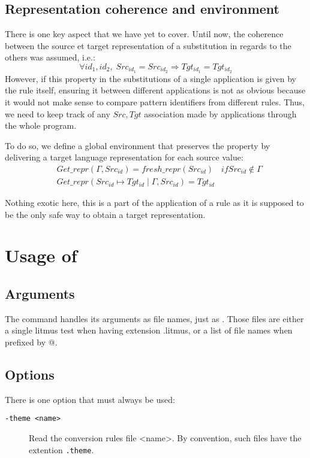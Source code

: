 \subsection{Representation coherence and environment}
There is one key aspect that we have yet to cover. Until now, the coherence between the source et target representation of
a substitution in regards to the others was assumed, i.e.:
\begin{equation*}
\forall id_1,id_2, \; Src_{id_1} = Src_{id_2} \Rightarrow Tgt_{id_1} = Tgt_{id_2}
\end{equation*}
However, if this property in the substitutions of a single application is given by the rule itself,
ensuring it between different applications is not as obvious because it would not make sense to
compare pattern identifiers from different rules. Thus, we need to keep track of any $Src,Tgt$
association made by applications through the whole program.

To do so, we define a global environment that preserves the property by delivering a target
language representation for each source value:
\begin{align*}
& Get\_repr(\Gamma,Src_{id}) = fresh\_repr(Src_{id}) & if Src_{id} \notin \Gamma\\
& Get\_repr(Src_{id}\mapsto Tgt_{id}\mid\Gamma,Src_{id}) = Tgt_{id} &
\end{align*}

Nothing exotic here, this is a part of the application of a rule as it is supposed
to be the only safe way to obtain a target representation.

\section{Usage of \jingle{}}

\subsection{Arguments}
The command \jingle{} handles its arguments as file names, just as \herd{}.
Those files are either a single litmus test when having extension .litmus,
or a list of file names when prefixed by @.

\subsection{Options}
There is one option that must always be used:

\begin{description}
\item[{\tt -theme <name>}] Read the conversion rules file <name>.
By convention, such files have the extention \verb+.theme+.
\end{description}

